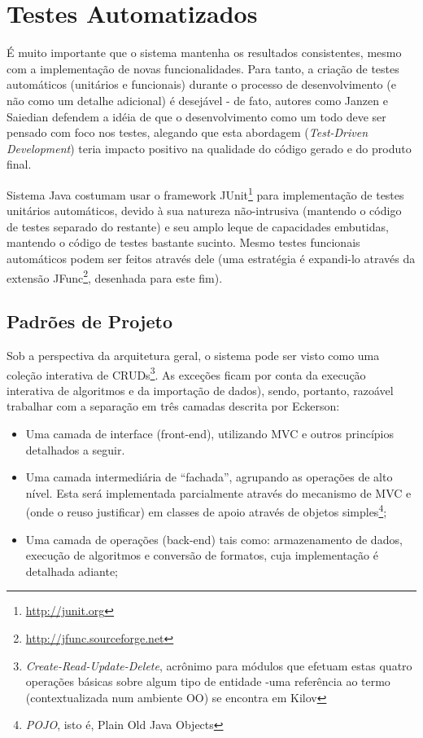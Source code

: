 \documentclass{abnt}
\begin{document}
\section{Testes Automatizados}

É muito importante que o sistema mantenha os resultados consistentes, mesmo com a implementação de novas funcionalidades. Para tanto, a criação de testes automáticos (unitários e funcionais) durante o processo de desenvolvimento (e não como um detalhe adicional) é desejável - de fato, autores como Janzen e Saiedian\cite{Janzen_Saiedian} defendem a idéia de que o desenvolvimento como um todo deve ser pensado com foco nos testes, alegando que esta abordagem (\textit{Test-Driven Development}) teria impacto positivo na qualidade do código gerado e do produto final.

Sistema Java costumam usar o framework JUnit\footnote{\url{http://junit.org}} para implementação de testes unitários automáticos, devido à sua natureza não-intrusiva (mantendo o código de testes separado do restante) e seu amplo leque de capacidades embutidas, mantendo o código de testes bastante sucinto. Mesmo testes funcionais automáticos podem ser feitos através dele (uma estratégia é expandi-lo através da extensão JFunc\footnote{\url{http://jfunc.sourceforge.net}}, desenhada para este fim).

\subsection{Padrões de Projeto}

Sob a perspectiva da arquitetura geral, o sistema pode ser visto como uma coleção interativa de CRUDs\footnote{\textit{Create-Read-Update-Delete}, acrônimo para módulos que efetuam estas quatro operações básicas sobre algum tipo de entidade -uma referência ao termo (contextualizada num ambiente OO) se encontra em Kilov\cite{kilov_crud}}. As exceções ficam por conta da execução interativa de algoritmos e da importação de dados), sendo, portanto, razoável trabalhar com a separação em três camadas descrita por Eckerson\cite{Eckerson1995}:

\begin{itemize}
\item Uma camada de interface (front-end), utilizando MVC e outros princípios detalhados a seguir.

\item Uma camada intermediária de “fachada”, agrupando as operações de alto nível. Esta será implementada parcialmente através do mecanismo de MVC e (onde o reuso justificar) em classes de apoio através de objetos simples\footnote{\textit{POJO}, isto é, Plain Old Java Objects};

\item Uma camada de operações (back-end) tais como: armazenamento de dados, execução de algoritmos e conversão de formatos, cuja implementação é detalhada adiante;


\end{itemize}
\end{document}
